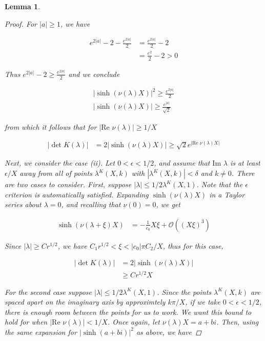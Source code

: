 \documentclass[12pt]{article}
\newtheorem{lemma}{Lemma}
\begin{document}
\begin{lemma}
\begin{proof}
For $|a| \geq 1$, we have

\begin{align*}
e^{2|a|} - 2 - \frac{e^{2|a|}}{2} 
&= \frac{e^{2|a|}}{2} - 2 \\
&= \frac{e^2}{2} - 2 > 0
\end{align*}

Thus $e^{2|a|} - 2 \geq \frac{e^{2|a|}}{2}$ and we conclude

\begin{align*}
|\sinh(\nu(\lambda) X)|^2 \geq \frac{e^{2|a|}}{2} \\
|\sinh(\nu(\lambda) X)| \geq \frac{e^{|a|}}{\sqrt{2}}
\end{align*}

from which it follows that for $|\text{Re } \nu(\lambda)| \geq 1/X$

\begin{align*}
|\det K(\lambda)| &= 2 |\sinh(\nu(\lambda) X)|
\geq \sqrt{2} e^{|\text{Re }\nu(\lambda)X|}
\end{align*}

Next, we consider the case (ii). Let $0 < \epsilon < 1/2$, and assume that $\text{Im }\lambda$ is at least $\epsilon/X$ away from all of points $\lambda^K(X,k)$ with $|\lambda^K(X,k)| < \delta$ and $k \neq 0$. There are two cases to consider. First, suppose $|\lambda| \leq 1/2 \lambda^K(X,1)$. Note that the $\epsilon$ criterion is automatically satisfied. Expanding $\sinh( \nu(\lambda) X)$ in a Taylor series about $\lambda = 0$, and recalling that $\nu(0) = 0$, we get

\begin{align*}
\sinh(\nu(\lambda + \xi) X) &= -\frac{1}{c_0}X\xi + \mathcal{O}((X \xi)^3)
\end{align*}

Since $|\lambda| \geq C r^{1/2}$, we have $C_1 r^{1/2} < \xi < |c_0| \pi C_2/X$, thus for this case,

\begin{align*}
|\det K(\lambda)| &= 2 |\sinh(\nu(\lambda) X)| \\
& \geq C r^{1/2}X
\end{align*}

For the second case suppose $|\lambda| \leq 1/2 \lambda^K(X,1)$. Since the points $\lambda^K(X,k)$ are spaced apart on the imaginary axis by approximtely $k \pi/X$, if we take $0 < \epsilon < 1/2$, there is enough room between the points for us to work. We want this bound to hold for when $|\text{Re } \nu(\lambda)| < 1/X$. Once again, let $\nu(\lambda) X = a + b i$. Then, using the same expansion for $|\sinh(a + b i)|^2$ as above, we have


\end{proof}
\end{lemma}
\end{document}
